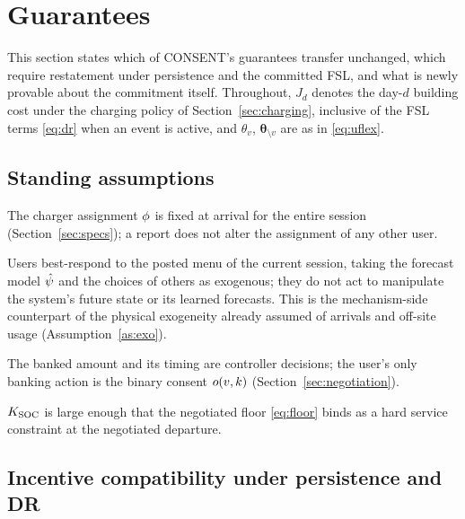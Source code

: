 \section{Guarantees}\label{sec:guarantees}

This section states which of CONSENT's guarantees transfer unchanged,
which require restatement under persistence and the committed FSL, and
what is newly provable about the commitment itself. Throughout, $J_d$
denotes the day-$d$ building cost under the charging policy of
Section~\ref{sec:charging}, inclusive of the FSL terms \eqref{eq:dr}
when an event is active, and $\theta_v$, $\bm{\theta}_{\setminus v}$
are as in \eqref{eq:uflex}.

\subsection{Standing assumptions}

\begin{assumption}\label{as:assign}
The charger assignment $\phi$ is fixed at arrival for the entire
session (Section~\ref{sec:specs}); a report does not alter the
assignment of any other user.
\end{assumption}

\begin{assumption}\label{as:oblivious}
Users best-respond to the posted menu of the current session, taking
the forecast model $\hat{\psi}$ and the choices of others as exogenous;
they do not act to manipulate the system's future state or its learned
forecasts. This is the mechanism-side counterpart of the physical
exogeneity already assumed of arrivals and off-site usage
(Assumption~\ref{as:exo}).
\end{assumption}

\begin{assumption}\label{as:bankctrl}
The banked amount and its timing are controller decisions; the user's
only banking action is the binary consent $o(v,k)$
(Section~\ref{sec:negotiation}).
\end{assumption}

\begin{assumption}\label{as:floor}
$K_{\mathrm{SOC}}$ is large enough that the negotiated floor \eqref{eq:floor}
binds as a hard service constraint at the negotiated departure.
\end{assumption}

\subsection{Incentive compatibility under persistence and DR}


